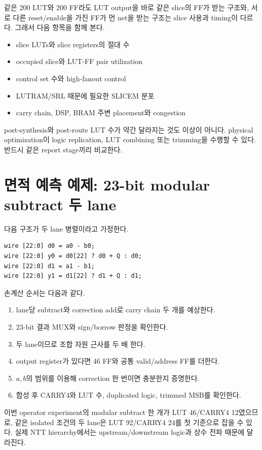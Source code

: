같은 200 LUT와 200 FF라도 LUT output을 바로 같은 slice의 FF가 받는 구조와,
서로 다른 reset/enable을 가진 FF가 먼 net을 받는 구조는 slice 사용과 timing이
다르다. 그래서 다음 항목을 함께 본다.

\begin{itemize}
  \item slice LUTs와 slice registers의 절대 수
  \item occupied slice와 LUT-FF pair utilization
  \item control set 수와 high-fanout control
  \item LUTRAM/SRL 때문에 필요한 SLICEM 분포
  \item carry chain, DSP, BRAM 주변 placement와 congestion
\end{itemize}

post-synthesis와 post-route LUT 수가 약간 달라지는 것도 이상이 아니다. physical
optimization이 logic replication, LUT combining 또는 trimming을 수행할 수 있다.
반드시 같은 report stage끼리 비교한다.

\section{면적 예측 예제: 23-bit modular subtract 두 lane}

다음 구조가 두 lane 병렬이라고 가정한다.

\begin{lstlisting}
wire [22:0] d0 = a0 - b0;
wire [22:0] y0 = d0[22] ? d0 + Q : d0;
wire [22:0] d1 = a1 - b1;
wire [22:0] y1 = d1[22] ? d1 + Q : d1;
\end{lstlisting}

손계산 순서는 다음과 같다.

\begin{enumerate}
  \item lane당 subtract와 correction add로 carry chain 두 개를 예상한다.
  \item 23-bit 결과 MUX와 sign/borrow 판정을 확인한다.
  \item 두 lane이므로 조합 자원 근사를 두 배 한다.
  \item output register가 있다면 46 FF와 공통 valid/address FF를 더한다.
  \item $a,b$의 범위를 이용해 correction 한 번이면 충분한지 증명한다.
  \item 합성 후 CARRY4와 LUT 수, duplicated logic, trimmed MSB를 확인한다.
\end{enumerate}

이번 operator experiment의 modular subtract 한 개가 LUT 46/CARRY4 12였으므로,
같은 isolated 조건의 두 lane은 LUT 92/CARRY4 24를 첫 기준으로 잡을 수 있다.
실제 NTT hierarchy에서는 upstream/downstream logic과 상수 전파 때문에 달라진다.

